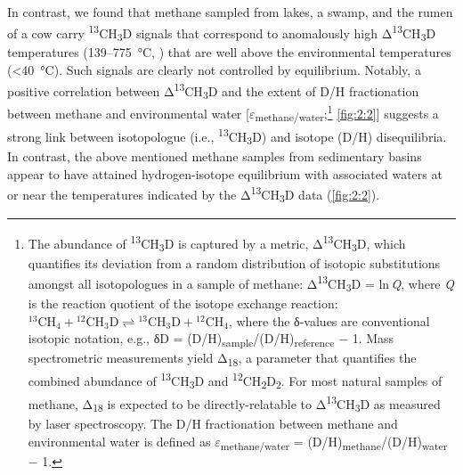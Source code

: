 In contrast, we found that methane sampled from lakes, a swamp, and the
rumen of a cow carry \textsuperscript{13}CH\textsubscript{3}D signals
that correspond to anomalously high
Δ\textsuperscript{13}CH\textsubscript{3}D temperatures (139--775~°C,
) that are well above the environmental temperatures (\textless{}40~°C). Such signals are clearly not controlled by equilibrium. Notably, a
positive correlation between Δ\textsuperscript{13}CH\textsubscript{3}D
and the extent of D/H fractionation between methane and environmental
water [$\varepsilon$\textsubscript{methane/water};\footnote{\label{fn:2:epsilon}The abundance of \textsuperscript{13}CH\textsubscript{3}D is
	captured by a metric, Δ\textsuperscript{13}CH\textsubscript{3}D, which
	quantifies its deviation from a random distribution of isotopic
	substitutions amongst all isotopologues in a sample of methane:
	Δ\textsuperscript{13}CH\textsubscript{3}D = ln\,\emph{Q}, where \emph{Q}
	is the reaction quotient of the isotope exchange reaction:
	$ {}^{13}\text{CH}_4+ {}^{12}{\text{CH}}_3\text{D}\rightleftharpoons {}^{13}{\text{CH}}_3\text{D}+ {}^{12}{\text{CH}}_4 $, where the δ-values are
	conventional isotopic notation, e.g., δD =
	(D/H)\textsubscript{sample}/(D/H)\textsubscript{reference} $-$ 1. Mass
	spectrometric measurements yield Δ\textsubscript{18}, a parameter that
	quantifies the combined abundance of
	\textsuperscript{13}CH\textsubscript{3}D and
	\textsuperscript{12}CH\textsubscript{2}D\textsubscript{2}. For most
	natural samples of methane, Δ\textsubscript{18} is expected to be
	directly-relatable to Δ\textsuperscript{13}CH\textsubscript{3}D as
	measured by laser spectroscopy. The D/H fractionation between methane
	and environmental water is defined as $\varepsilon$\textsubscript{methane/water} =
	(D/H)\textsubscript{methane}/(D/H)\textsubscript{water} $-$ 1.} \autoref{fig:2:2}] suggests
a strong link between isotopologue (i.e.,
\textsuperscript{13}CH\textsubscript{3}D) and isotope (D/H)
disequilibria. In contrast, the above mentioned methane samples from
sedimentary basins appear to have attained hydrogen-isotope equilibrium
with associated waters at or near the temperatures indicated by the
Δ\textsuperscript{13}CH\textsubscript{3}D data (\autoref{fig:2:2}).

